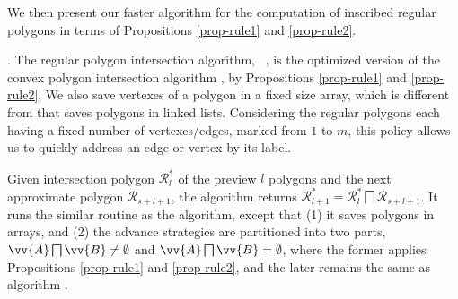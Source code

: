 We then present our faster algorithm for the computation of inscribed regular polygons in terms of Propositions \ref{prop-rule1} and \ref{prop-rule2}.


.
The regular polygon intersection algorithm, \ie\ \rpia, is the optimized version of the convex polygon intersection algorithm \cpia, by Propositions \ref{prop-rule1} and \ref{prop-rule2}. We also save vertexes of a polygon in a fixed size array, which is different from \cpia  that saves polygons in linked lists.
Considering the regular polygons each having a fixed number of vertexes/edges, marked from $1$ to $m$, this policy allows us to quickly address an edge or vertex by its label.

Given intersection polygon $\mathcal{R}^*_{l}$ of the preview $l$ polygons and the next approximate polygon $\mathcal{R}_{s+l+1}$, the algorithm \rpia returns $\mathcal{R}^*_{l+1}=\mathcal{R}^*_{l}  \bigsqcap \mathcal{R}_{s+l+1}$.
It runs the similar routine as the \cpia algorithm, except that (1) it saves polygons in arrays, and (2) the advance strategies are partitioned into two parts, \ie $\vv{A} \bigsqcap \vv{B} \ne \emptyset$ and $\vv{A} \bigsqcap \vv{B} = \emptyset$, where the former applies Propositions \ref{prop-rule1} and \ref{prop-rule2}, and the later remains the same as algorithm \cpia.





